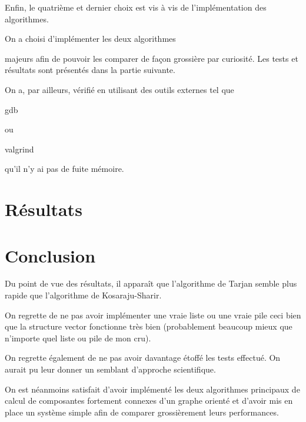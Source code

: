 \documentclass[12pt,a4paper,titlepage]{article}
\begin{document}
Enfin, le quatrième et dernier choix est vis à vis de l'implémentation des algorithmes. 
\begin{bf}On a choisi d'implémenter les deux algorithmes\end{bf} majeurs afin de pouvoir 
les comparer de façon grossière par curiosité. Les tests et résultats sont 
présentés dans la partie suivante.

On a, par ailleurs, vérifié en utilisant des outils externes tel que 
\begin{bf}gdb\end{bf} ou \begin{bf}valgrind\end{bf} 
qu'il n'y ai pas de fuite mémoire.






\clearpage{\pagestyle{empty}}



\section{Résultats}







\clearpage{\pagestyle{empty}}



\section{Conclusion}
Du point de vue des résultats, il apparaît que l'algorithme de Tarjan semble 
plus rapide que l'algorithme de Kosaraju-Sharir.

On regrette de ne pas avoir implémenter une \og{}vraie\fg{} liste ou 
une \og{}vraie\fg{} pile ceci bien que la structure vector fonctionne très bien 
(probablement beaucoup mieux que n'importe quel liste ou pile de mon cru).

On regrette également de ne pas avoir davantage étoffé les tests effectué. 
On aurait pu leur donner un semblant d'approche scientifique.

On est néanmoins satisfait d'avoir implémenté les deux algorithmes principaux 
de calcul de composantes fortement connexes d'un graphe orienté et d'avoir 
mis en place un système simple afin de comparer grossièrement leurs performances.






\clearpage{\pagestyle{empty}}
\end{document}
